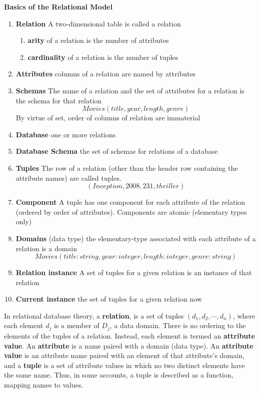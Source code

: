 \documentclass[11pt]{article}
\begin{document}
\begin{defn*}
    \textbf{Basics of the Relational Model}
    \begin{enumerate}
        \item \textbf{Relation} A two-dimensional table is called a relation
        \begin{enumerate}
            \item \textbf{arity} of a relation is the number of attributes 
            \item \textbf{cardinality} of a relation is the number of tuples
        \end{enumerate}
        \item \textbf{Attributes} columns of a relation are named by attributes
        \item \textbf{Schemas} The name of a relation and the set of attributes for a relation is the schema for that relation 
        \[
            Movies(title, year, length, genre)
        \]
        By virtue of set, order of columns of relation are immaterial
        \item \textbf{Database} one or more relations 
        \item \textbf{Database Schema} the set of schemas for relations of a database 
        \item \textbf{Tuples} The row of a relation (other than the header row containing the attribute names) are called tuples. 
        \[
            (Inception, 2008, 231, thriller)
        \]
        \item \textbf{Component} A tuple has one component for each attribute of the relation (ordered by order of attributes). Components are atomic (elementary types only) 
        \item \textbf{Domains} (data type) the elementary-type associated with each attribute of a relation is a domain 
        \[
            Movies(title:string, year:integer, length:integer, genre:string)
        \]
        \item \textbf{Relation instance} A set of tuples for a given relation is an instance of that relation
        \item \textbf{Current instance} the set of tuples for a given relation now
        \end{enumerate}
\end{defn*}


\begin{note}
    In relational database theory, a \textbf{relation}, is a set of tuples $(d_1, d_2, \cdots, d_n)$, where each element $d_j$ is a member of $D_j$, a data domain. There is no ordering to the elements of the tuples of a relation. Instead, each element is termed an \textbf{attribute value}. An \textbf{attribute} is a name paired with a domain (data type). An \textbf{attribute value} is an attribute name paired with an element of that attribute's domain, and a \textbf{tuple} is a set of attribute values in which no two distinct elements have the same name. Thus, in some accounts, a tuple is described as a function, mapping names to values.
\end{note}
\end{document}
